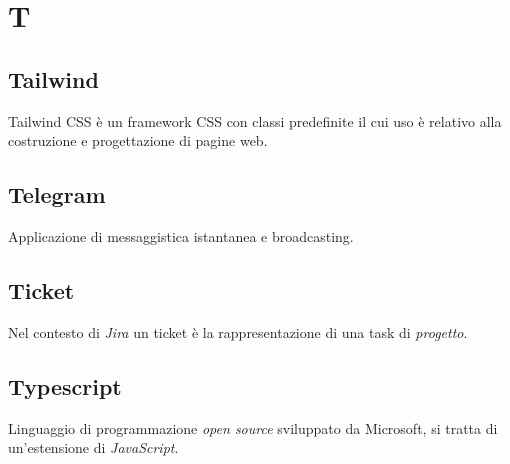 \chapter{T}

\section{Tailwind}
Tailwind CSS è un framework CSS con classi predefinite il cui uso è relativo alla costruzione e progettazione di pagine web.

\section{Telegram}
Applicazione di messaggistica istantanea e broadcasting.
\section{Ticket}
Nel contesto di \emph{Jira} un ticket è la rappresentazione di una task di \emph{progetto}.
\section{Typescript}
Linguaggio di programmazione \emph{open source} sviluppato da Microsoft, si tratta di un'estensione di \emph{JavaScript}. 
